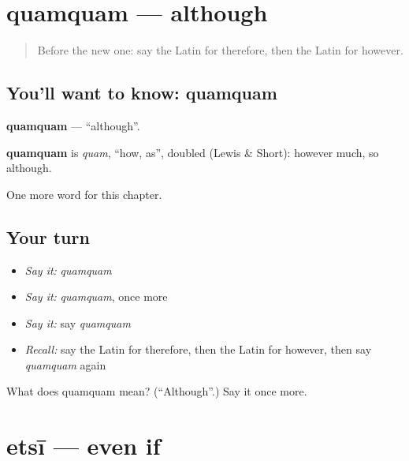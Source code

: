 \section[quamquam]{quamquam — although}

\label{lesson:LA-C178-quamquam}



\begin{quote}
Before the new one: say the Latin for therefore, then the Latin for however.
\end{quote}

\subsection*{You'll want to know: quamquam}
\textbf{quamquam} — \textquotedblleft{}although\textquotedblright{}.

\begin{cousinweb}
\textbf{quamquam} is \emph{quam}, \textquotedblleft{}how, as\textquotedblright{}, doubled (Lewis \& Short): however much, so although.
\end{cousinweb}

\begin{grammarlens}[title={What you've built}]
One more word for this chapter.
\end{grammarlens}

\subsection*{Your turn}
\begin{itemize}
\raggedright
  \item \emph{Say it:} \emph{quamquam}
  \item \emph{Say it:} \emph{quamquam}, once more
  \item \emph{Say it:} say \emph{quamquam}
  \item \emph{Recall:} say the Latin for therefore, then the Latin for however, then say \emph{quamquam} again
\end{itemize}

\begin{tcolorbox}[breakable,colback=teal!4,colframe=teal!35!black,title={Before you move on}]
What does quamquam mean? (\textquotedblleft{}Although\textquotedblright{}.) Say it once more.
\end{tcolorbox}
\section[etsī]{etsī — even if}

